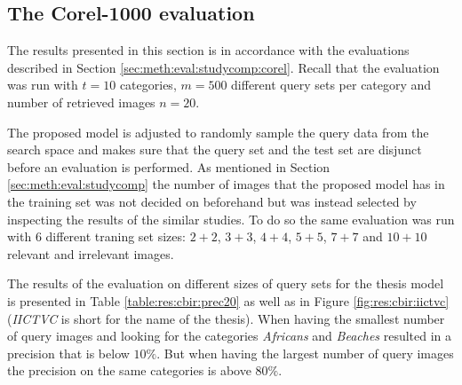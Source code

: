 \subsection{The Corel-1000 evaluation}
\label{sec:res:studycomp:corel}
The results presented in this section is in accordance with the evaluations described in Section \ref{sec:meth:eval:studycomp:corel}. Recall that the evaluation was run with $t=10$ categories, $m=500$ different query sets per category and number of retrieved images $n=20$.

The proposed model is adjusted to randomly sample the query data from the search space and makes sure that the query set and the test set are disjunct before an evaluation is performed. As mentioned in Section \ref{sec:meth:eval:studycomp} the number of images that the proposed model has in the training set was not decided on beforehand but was instead selected by inspecting the results of the similar studies. To do so the same evaluation was run with 6 different traning set sizes: $2+2$, $3+3$, $4+4$, $5+5$, $7+7$ and $10+10$ relevant and irrelevant images. 


The results of the evaluation on different sizes of query sets for the thesis model is presented in Table \ref{table:res:cbir:prec20} as well as in Figure \ref{fig:res:cbir:iictvc} (\emph{IICTVC} is short for the name of the thesis). When having the smallest number of query images and looking for the categories \emph{Africans} and \emph{Beaches} resulted in a precision that is below $10\%$. But when having the largest number of query images the precision on the same categories is above $80\%$.


